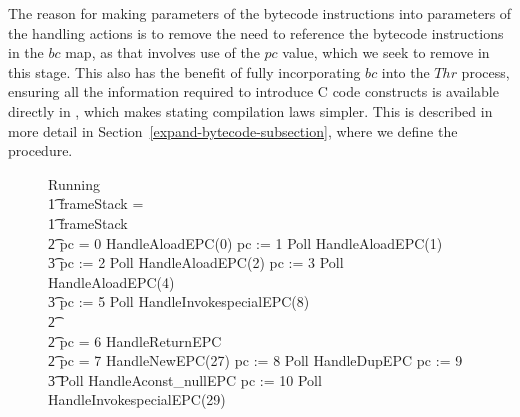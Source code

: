 The reason for making parameters of the bytecode instructions into
parameters of the handling actions is to remove the need to reference
the bytecode instructions in the $bc$ map, as that involves use of the
$pc$ value, which we seek to remove in this stage.
This also has the benefit of fully incorporating $bc$ into the $Thr$
process, ensuring all the information required to introduce C code
constructs is available directly in \Circus{}, which makes stating
compilation laws simpler.
This is described in more detail in
Section~\ref{expand-bytecode-subsection}, where we define the
 procedure.

\begin{figure}[t!]
  \setlength{\zedindent}{0cm}
  \setlength{\zedtab}{0.3cm}
  \setlength{\zedleftsep}{0.1cm}
  \begin{circus}
    Running \circdef \\
    \t1 \circif frameStack = \emptyset \circthen \Skip \\
    \t1 {} \circelse frameStack \neq \emptyset \circthen {} \\
    \t2 \circif pc = 0 \circthen HandleAloadEPC(0) \circseq pc := 1 \circseq Poll \circseq HandleAloadEPC(1) \circseq \\
    \t3 pc := 2 \circseq Poll \circseq HandleAloadEPC(2) \circseq pc := 3 \circseq Poll \circseq HandleAloadEPC(4) \circseq \\
    \t3 pc := 5 \circseq Poll \circseq HandleInvokespecialEPC(8) \\
    \t2 {} \cdots {} \\
    \t2 {} \circelse pc = 6 \circthen HandleReturnEPC \\
    \t2 {} \circelse pc = 7 \circthen HandleNewEPC(27) \circseq pc := 8 \circseq Poll \circseq HandleDupEPC \circseq pc := 9 \circseq \\
    \t3 Poll \circseq HandleAconst\_nullEPC \circseq pc := 10 \circseq Poll \circseq HandleInvokespecialEPC(29) \\

\end{circus}
\end{figure}
